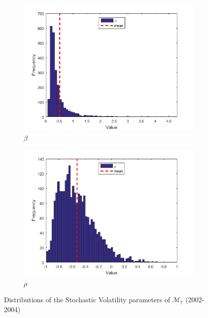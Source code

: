 \documentclass[11pt,a4,twosided,singlespacing,titlepagenumber=on]{scrreprt}
\numberwithin{equation}{chapter} %
\theoremstyle{remark}
\begin{document}
\begin{figure}[H]
\begin{subfigure}[t]{0.32\textwidth}
        \includegraphics[width=1\textwidth]{res/params/4384_5114/5}
        \caption{$\beta$}
    \end{subfigure}
    \begin{subfigure}[t]{0.32\textwidth}
        \centering
        \includegraphics[width=1\textwidth]{res/params/4384_5114/6}
        \caption{$\rho$}
    \end{subfigure}
    \caption[]{Distributions of the Stochastic Volatility parameters of $\mathcal{M}_7$ (2002-2004)}
    \label{fig:param_dists_2000_2002}
\end{figure}
\end{document}
